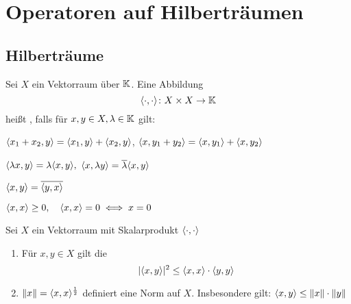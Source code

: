 

\chapter*{Operatoren auf Hilberträumen}  \setcounter{section}{14}



\section{Hilberträume}



\begin{definition} \label{def:15.1-Skalarprodukt}
	Sei $X$ ein Vektorraum über $\mathbb{K}$. Eine Abbildung
	\[ \langle \cdot, \cdot \rangle \colon X \times X \rightarrow \mathbb{K} \]
	hei{\ss}t , falls für $x, y \in X, \lambda \in \mathbb{K}$ gilt:
	\begin{description}
	 	\label{def:15.1i}
	 	\item[$\hspace{0.5cm} (S1) \hspace{0.1cm} $] $\langle x_{1} + x_{2}, y \rangle = \langle x_{1}, y \rangle + \langle x_{2}, y \rangle$, $\langle x, y_{1} + y_{2} \rangle = \langle x, y_{1} \rangle + \langle x, y_{2} \rangle$
 		\label{def:15.1ii}
	 	\item[$\hspace{0.5cm} (S2) \hspace{0.1cm} $] $\langle \lambda x, y \rangle = \lambda \langle x, y \rangle,$ $\langle x, \lambda y \rangle = \overline{\lambda} \langle x, y \rangle$
 		\label{def:15.1iii}
	 	\item[$\hspace{0.5cm} (S3) \hspace{0.1cm} $] $\langle x, y \rangle = \overline{\langle y, x \rangle }$
 		\label{def:15.1iv}
	 	\item[$\hspace{0.5cm} (S4) \hspace{0.1cm} $] $\langle x, x \rangle \geq 0, \quad \langle x, x \rangle = 0 \iff x = 0$
	\end{description}
\end{definition}


\begin{prop} \label{prop:15.2}
	Sei $X$ ein Vektorraum mit Skalarprodukt $\langle \cdot, \cdot \rangle$
	\begin{enumerate}[label=\alph*\upshape)] \label{prop:15.2a}
		\item Für $x, y \in X$ gilt die 
			\[ | \langle x, y \rangle |^{2} \leq \langle x, x \rangle \cdot \langle y, y \rangle \]
		\item $\| x \| = \langle x, x \rangle^{\frac{1}{2}}$ definiert eine Norm auf $X$. Insbesondere gilt: $\langle x, y \rangle \leq \| x \| \cdot \| y \|$ \label{prop:15.2b}
	\end{enumerate}	
\end{prop}

